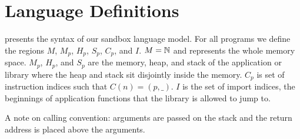 \section{Language Definitions}
\label{appendix:language-defs}

 presents the syntax of our sandbox language model.
%
For all programs we define the regions $M$, $M_p$, $H_p$, $S_p$, $C_p$, and $I$.
%
$M = \mathbb{N}$ and represents the whole memory space.
%
$M_p$, $H_p$, and $S_p$ are the memory, heap, and stack of the application or library where the heap and stack sit disjointly inside the memory.
%
$C_p$ is set of instruction indices such that $C(n) = (p, \_)$.
%
$I$ is the set of import indices, the beginnings of application functions that the library is allowed to jump to.

A note on calling convention: arguments are passed on the stack and the return
address is placed above the arguments.

